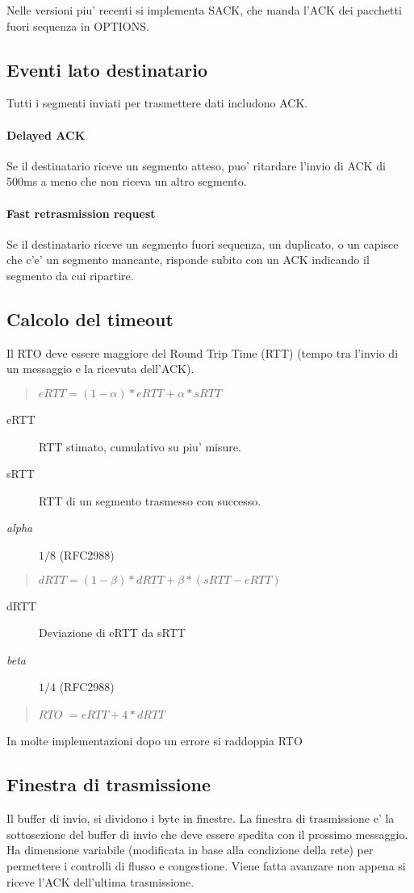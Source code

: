 Nelle versioni piu' recenti si implementa SACK, che manda l'ACK dei pacchetti fuori sequenza in OPTIONS.
\subsection{Eventi lato destinatario}
Tutti i segmenti inviati per trasmettere dati includono ACK.
\paragraph{Delayed ACK} Se il destinatario riceve un segmento atteso, puo' ritardare l'invio di ACK di 500ms a meno che non riceva un altro segmento.
\paragraph{Fast retrasmission request}Se il destinatario riceve un segmento fuori sequenza, un duplicato, o un capisce che c'e' un segmento mancante, risponde subito con un ACK indicando il segmento da cui ripartire.
\subsection{Calcolo del timeout}
Il RTO deve essere maggiore del Round Trip Time (RTT) (tempo tra l'invio di un messaggio e la ricevuta dell'ACK).
\begin{quote}
    $eRTT = (1 - \alpha) * eRTT + \alpha * sRTT$
\end{quote}
\begin{description}
    \item[eRTT] RTT stimato, cumulativo su piu' misure.
    \item[sRTT] RTT di un segmento trasmesso con successo.
    \item[\textit{alpha}] $1/8$ (RFC2988)
\end{description}
\begin{quote}
    \small$dRTT = (1 - \beta) * dRTT + \beta * (sRTT - eRTT)$
\end{quote}
\begin{description}
    \item[dRTT] Deviazione di eRTT da sRTT
    \item[\textit{beta}] $1/4$ (RFC2988)
\end{description}
\begin{quote}
    {\boldmath$RTO$} $ = eRTT + 4*dRTT$
\end{quote}
In molte implementazioni dopo un errore si raddoppia RTO
\subsection{Finestra di trasmissione}
Il buffer di invio, si dividono i byte in {\color{blue}finestre}.
La finestra di trasmissione e' la sottosezione del buffer di invio che deve essere spedita con il prossimo messaggio.
Ha dimensione variabile (modificata in base alla condizione della rete) per permettere i controlli di flusso e congestione.
Viene fatta avanzare non appena si riceve l'ACK dell'ultima trasmissione.
